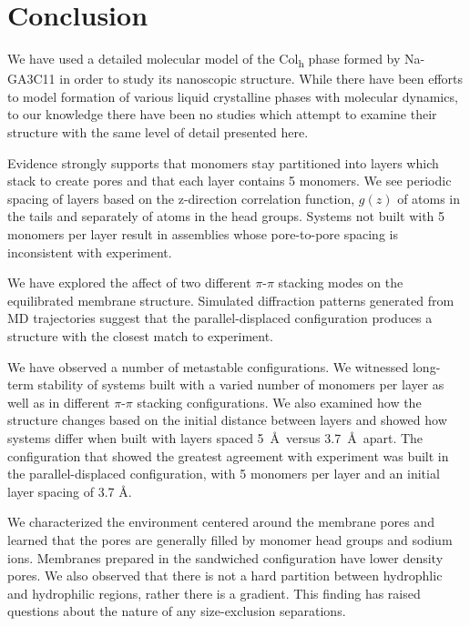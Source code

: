 \documentclass{article}
\begin{document}
  \section{Conclusion}
  
  We have used a detailed molecular model of the Col\textsubscript{h} phase
  formed by Na-GA3C11 in order to study its nanoscopic structure. While there
  have been efforts to model formation of various liquid crystalline phases with
  molecular dynamics, to our knowledge there have been no studies which attempt
  to examine their structure with the same level of detail presented here.

  Evidence strongly supports that monomers stay partitioned into layers which
  stack to create pores and that each layer contains 5 monomers. We see periodic
  spacing of layers based on the z-direction correlation function, $g(z)$ of
  atoms in the tails and separately of atoms in the head groups.  Systems not
  built with 5 monomers per layer result in assemblies whose pore-to-pore spacing
  is inconsistent with experiment. 

  We have explored the affect of two different $\pi$-$\pi$ stacking modes on
  the equilibrated membrane structure. Simulated diffraction patterns generated
  from MD trajectories suggest that the parallel-displaced configuration produces
  a structure with the closest match to experiment.

  We have observed a number of metastable configurations. We witnessed
  long-term stability of systems built with a varied number of monomers per layer
  as well as in different $\pi$-$\pi$ stacking configurations. We also examined
  how the structure changes based on the initial distance between layers and
  showed how systems differ when built with layers spaced 5~\AA~versus
  3.7~\AA~apart. The configuration that showed the greatest agreement with
  experiment was built in the parallel-displaced configuration, with 5 monomers
  per layer and an initial layer spacing of 3.7 \AA.  

  We characterized the environment centered around the membrane pores and
  learned that the pores are generally filled by monomer head groups and sodium
  ions. Membranes prepared in the sandwiched configuration have lower density 
  pores. We also observed that there is not a hard partition between hydrophlic
  and hydrophilic regions, rather there is a gradient.  This finding has raised
  questions about the nature of any size-exclusion separations.  
\end{document}
